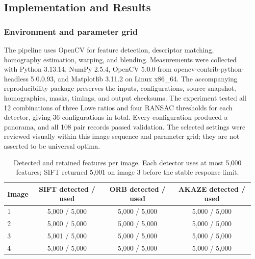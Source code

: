 \documentclass[a4paper,12pt]{article}
\begin{document}
\subsection{Implementation and Results}

\subsubsection{Environment and parameter grid}
The pipeline uses OpenCV for feature detection, descriptor matching, homography estimation, warping, and blending. Measurements were collected with Python 3.13.14, NumPy 2.5.4, OpenCV 5.0.0 from opencv-contrib-python-headless 5.0.0.93, and Matplotlib 3.11.2 on Linux x86\_64. The accompanying reproducibility package preserves the inputs, configurations, source snapshot, homographies, masks, timings, and output checksums. The experiment tested all 12 combinations of three Lowe ratios and four RANSAC thresholds for each detector, giving 36 configurations in total. Every configuration produced a panorama, and all 108 pair records passed validation. The selected settings were reviewed visually within this image sequence and parameter grid; they are not asserted to be universal optima.

\begin{table}[htbp]
\centering
\small
\caption{Detected and retained features per image. Each detector uses at most 5,000 features; SIFT returned 5,001 on image 3 before the stable response limit.}
\label{tab:c-keypoints}
\begin{tabular}{lccc}
\toprule
Image & SIFT detected / used & ORB detected / used & AKAZE detected / used \\
\midrule
1 & 5,000 / 5,000 & 5,000 / 5,000 & 5,000 / 5,000 \\
2 & 5,000 / 5,000 & 5,000 / 5,000 & 5,000 / 5,000 \\
3 & 5,001 / 5,000 & 5,000 / 5,000 & 5,000 / 5,000 \\
4 & 5,000 / 5,000 & 5,000 / 5,000 & 5,000 / 5,000 \\
\bottomrule
\end{tabular}
\end{table}
\end{document}
